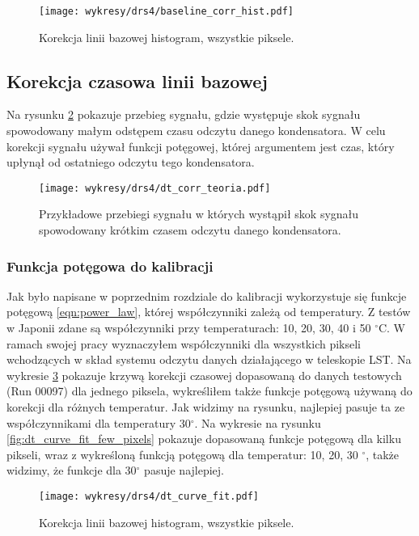 \documentclass[a4paper,11pt,twoside]{article}
\begin{document}
\begin{figure}[H] 
\centering
\texttt{[image: wykresy/drs4/baseline\_corr\_hist.pdf]}
\caption{Korekcja linii bazowej histogram, wszystkie piksele.}
\label{fig:baseline_corr_hist}
\end{figure}

\newpage
\subsection{Korekcja czasowa linii bazowej}
Na rysunku \ref{fig:dt_corr_Waveform} pokazuje przebieg sygnału, gdzie występuje skok sygnału spowodowany małym odstępem czasu odczytu danego kondensatora. W celu korekcji sygnału używał funkcji potęgowej, której argumentem jest czas, który upłynął od ostatniego odczytu tego kondensatora.  
\begin{figure}[H] 
\centering
\texttt{[image: wykresy/drs4/dt\_corr\_teoria.pdf]}
\caption{Przykładowe przebiegi sygnału w których wystąpił skok sygnału spowodowany krótkim czasem odczytu danego kondensatora.}
\label{fig:dt_corr_Waveform}
\end{figure}
\subsubsection{Funkcja potęgowa do kalibracji}
Jak było napisane w poprzednim rozdziale do kalibracji wykorzystuje się funkcje potęgową \ref{eqn:power_law}, której współczynniki zależą od temperatury. Z testów w Japonii zdane są współczynniki przy temperaturach: 10, 20, 30, 40 i 50 $^\circ$C. W ramach swojej pracy wyznaczyłem  współczynniki dla wszystkich pikseli wchodzących w skład systemu odczytu danych działającego w teleskopie LST. Na wykresie \ref{fig:dt_curve_fit_all_temp} pokazuje krzywą korekcji czasowej dopasowaną do danych testowych (Run 00097) dla jednego piksela, wykreśliłem także funkcje potęgową używaną do korekcji dla różnych temperatur. Jak widzimy na rysunku, najlepiej pasuje ta ze współczynnikami dla temperatury 30$^{\circ}$. Na wykresie na rysunku \ref{fig:dt_curve_fit_few_pixels} pokazuje dopasowaną funkcje potęgową dla kilku pikseli, wraz z wykreśloną funkcją potęgową dla temperatur: 10, 20, 30 $^{\circ}$, także widzimy, że funkcje dla 30$^{\circ}$ pasuje najlepiej. 
\begin{figure}[H] 
\centering
\texttt{[image: wykresy/drs4/dt\_curve\_fit.pdf]}
\caption{Korekcja linii bazowej histogram, wszystkie piksele.}
\label{fig:dt_curve_fit_all_temp}
\end{figure}
\end{document}

